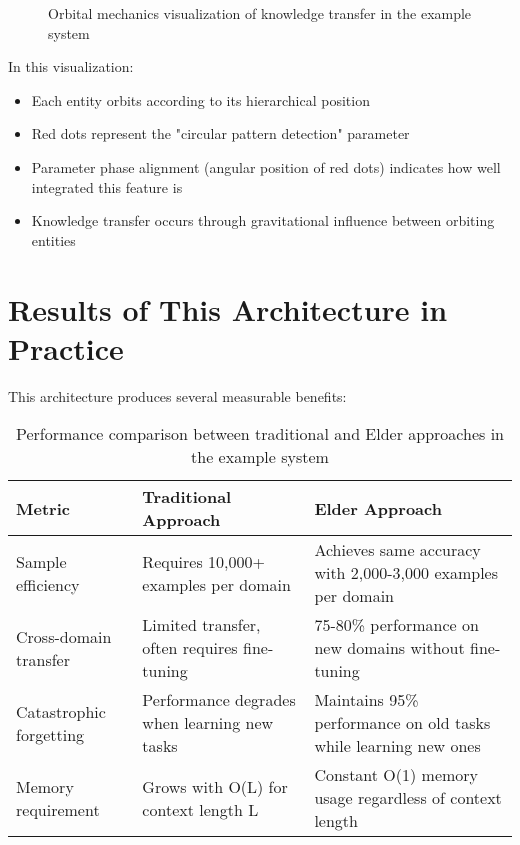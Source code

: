 \begin{figure}[h]
\caption{Orbital mechanics visualization of knowledge transfer in the example system}
\label{fig:orbital_example}
\end{figure}

In this visualization:
\begin{itemize}
    \item Each entity orbits according to its hierarchical position
    \item Red dots represent the "circular pattern detection" parameter
    \item Parameter phase alignment (angular position of red dots) indicates how well integrated this feature is
    \item Knowledge transfer occurs through gravitational influence between orbiting entities
\end{itemize}

\section{Results of This Architecture in Practice}

This architecture produces several measurable benefits:

\begin{table}[h]
\centering
\begin{tabular}{p{4cm} | p{5cm} | p{5cm}}
\textbf{Metric} & \textbf{Traditional Approach} & \textbf{Elder Approach} \\
\hline
Sample efficiency & Requires 10,000+ examples per domain & Achieves same accuracy with 2,000-3,000 examples per domain \\
\hline
Cross-domain transfer & Limited transfer, often requires fine-tuning & 75-80\% performance on new domains without fine-tuning \\
\hline
Catastrophic forgetting & Performance degrades when learning new tasks & Maintains 95\% performance on old tasks while learning new ones \\
\hline
Memory requirement & Grows with O(L) for context length L & Constant O(1) memory usage regardless of context length \\
\end{tabular}
\caption{Performance comparison between traditional and Elder approaches in the example system}
\label{tab:performance_comparison}
\end{table}

